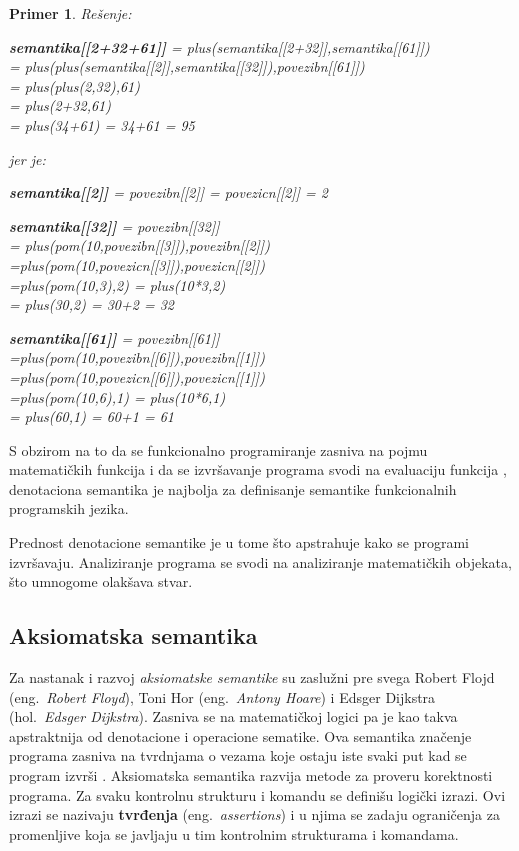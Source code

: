 \documentclass[a4paper]{article}
\newtheorem{primer}{Primer}[section]
\begin{document}
{\begin{primer}
Rešenje:
\begin{center}
\textbf{semantika[[2+32+61]]} = plus(semantika[[2+32]],semantika[[61]])\\
= plus(plus(semantika[[2]],semantika[[32]]),povezibn[[61]])\\
= plus(plus(2,32),61)\\
= plus(2+32,61)\\
= plus(34+61) = 34+61 = 95
\end{center}

jer je:

\begin{center}
\textbf{semantika[[2]]} = povezibn[[2]] = povezicn[[2]] = 2
\end{center}
\begin{center}
\textbf{semantika[[32]]} = povezibn[[32]]\\
= plus(pom(10,povezibn[[3]]),povezibn[[2]])\\
=plus(pom(10,povezicn[[3]]),povezicn[[2]]) \\
=plus(pom(10,3),2) = plus(10*3,2)\\
= plus(30,2) = 30+2 = 32\end{center}

\begin{center}
\textbf{semantika[[61]]} = povezibn[[61]] \\
=plus(pom(10,povezibn[[6]]),povezibn[[1]])\\
=plus(pom(10,povezicn[[6]]),povezicn[[1]]) \\
=plus(pom(10,6),1) = plus(10*6,1)\\
= plus(60,1) = 60+1 = 61

\end{center}
\end{primer}

S obzirom na to da se funkcionalno programiranje zasniva na pojmu matematičkih funkcija i da se izvršavanje programa svodi na evaluaciju funkcija \cite{milena2}, denotaciona semantika je najbolja za definisanje semantike funkcionalnih programskih jezika.


 Prednost denotacione semantike je u tome što apstrahuje kako se programi izvršavaju. Analiziranje programa se svodi na analiziranje matematičkih objekata, što umnogome olakšava stvar.

\subsection{Aksiomatska semantika}
\label{sec:akssem}
\qquad Za nastanak i razvoj \textit{aksiomatske semantike}  su zaslužni pre svega Robert Flojd (eng.~{\em  Robert Floyd}), Toni Hor (eng.~{\em  Antony Hoare}) i Edsger Dijkstra (hol.~{\em Edsger Dijkstra}).
 Zasniva se na matematičkoj logici pa je kao takva apstraktnija od denotacione i operacione sematike. Ova semantika
 značenje programa zasniva na tvrdnjama o vezama koje ostaju iste svaki put kad se program izvrši \cite{slonneger1995book}.
 Aksiomatska semantika razvija metode za proveru korektnosti programa. Za svaku kontrolnu strukturu i komandu se definišu logički izrazi. Ovi izrazi se nazivaju \textbf{tvrđenja} (eng.~{\em  assertions}) i u njima se zadaju ograničenja za promenljive koja se javljaju u tim kontrolnim strukturama i komandama.

}
\end{document}

